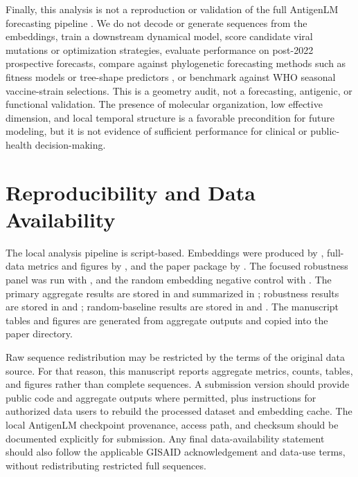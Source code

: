 \documentclass[11pt]{article}
\begin{document}
Finally, this analysis is not a reproduction or validation of the full AntigenLM forecasting pipeline \cite{pei2026antigenlm}. We do not decode or generate sequences from the embeddings, train a downstream dynamical model, score candidate viral mutations or optimization strategies, evaluate performance on post-2022 prospective forecasts, compare against phylogenetic forecasting methods such as fitness models or tree-shape predictors \cite{luksza2014fitness,neher2014predicting}, or benchmark against WHO seasonal vaccine-strain selections. This is a geometry audit, not a forecasting, antigenic, or functional validation. The presence of molecular organization, low effective dimension, and local temporal structure is a favorable precondition for future modeling, but it is not evidence of sufficient performance for clinical or public-health decision-making.

\section{Reproducibility and Data Availability}

The local analysis pipeline is script-based. Embeddings were produced by , full-data metrics and figures by , and the paper package by . The focused robustness panel was run with , and the random embedding negative control with . The primary aggregate results are stored in  and summarized in ; robustness results are stored in  and ; random-baseline results are stored in  and . The manuscript tables and figures are generated from aggregate outputs and copied into the paper directory.

Raw sequence redistribution may be restricted by the terms of the original data source. For that reason, this manuscript reports aggregate metrics, counts, tables, and figures rather than complete sequences. A submission version should provide public code and aggregate outputs where permitted, plus instructions for authorized data users to rebuild the processed dataset and embedding cache. The local AntigenLM checkpoint provenance, access path, and checksum should be documented explicitly for submission. Any final data-availability statement should also follow the applicable GISAID acknowledgement and data-use terms, without redistributing restricted full sequences.
\end{document}
